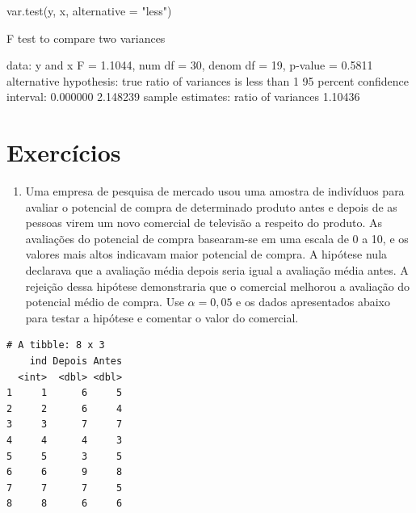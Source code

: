 \documentclass[
  10pt,
  a4paper]{book}
\newenvironment{Shaded}{\begin{snugshade}}{\end{snugshade}}
\newcommand{\AttributeTok}[1]{\textcolor[rgb]{0.77,0.63,0.00}{#1}}
\newcommand{\DecValTok}[1]{\textcolor[rgb]{0.00,0.00,0.81}{#1}}
\newcommand{\FloatTok}[1]{\textcolor[rgb]{0.00,0.00,0.81}{#1}}
\newcommand{\FunctionTok}[1]{\textcolor[rgb]{0.00,0.00,0.00}{#1}}
\newcommand{\NormalTok}[1]{#1}
\newcommand{\OtherTok}[1]{\textcolor[rgb]{0.56,0.35,0.01}{#1}}
\newcommand{\SpecialCharTok}[1]{\textcolor[rgb]{0.00,0.00,0.00}{#1}}
\newcommand{\StringTok}[1]{\textcolor[rgb]{0.31,0.60,0.02}{#1}}
\providecommand{\tightlist}{%
  \setlength{\itemsep}{0pt}\setlength{\parskip}{0pt}}
\begin{document}
\begin{Shaded}
\begin{Highlighting}[]
\FunctionTok{var.test}\NormalTok{(y, x, }\AttributeTok{alternative =} \StringTok{"less"}\NormalTok{)}

\NormalTok{    F test to compare two variances}

\NormalTok{data}\SpecialCharTok{:}\NormalTok{  y and x}
\NormalTok{F }\OtherTok{=} \FloatTok{1.1044}\NormalTok{, num df }\OtherTok{=} \DecValTok{30}\NormalTok{, denom df }\OtherTok{=} \DecValTok{19}\NormalTok{, p}\SpecialCharTok{{-}}\NormalTok{value }\OtherTok{=} \FloatTok{0.5811}
\NormalTok{alternative hypothesis}\SpecialCharTok{:}\NormalTok{ true ratio of variances is less than }\DecValTok{1}
\DecValTok{95}\NormalTok{ percent confidence interval}\SpecialCharTok{:}
 \FloatTok{0.000000} \FloatTok{2.148239}
\NormalTok{sample estimates}\SpecialCharTok{:}
\NormalTok{ratio of variances }
           \FloatTok{1.10436} 
\end{Highlighting}
\end{Shaded}

\hypertarget{exercuxedcios-19}{%
\section*{Exercícios}\label{exercuxedcios-19}}


\begin{enumerate}
\def\labelenumi{\arabic{enumi}.}
\tightlist
\item
  Uma empresa de pesquisa de mercado usou uma amostra de indivíduos para avaliar o potencial de compra de determinado produto antes e depois de as pessoas virem um novo comercial de televisão a respeito do produto. As avaliações do potencial de compra basearam-se em uma escala de 0 a 10, e os valores mais altos indicavam maior potencial de compra. A hipótese nula declarava que a avaliação média depois seria igual a avaliação média antes. A rejeição dessa hipótese demonstraria que o comercial melhorou a avaliação do potencial médio de compra. Use \(\alpha = 0,05\) e os dados apresentados abaixo para testar a hipótese e comentar o valor do comercial.
\end{enumerate}

\begin{verbatim}
# A tibble: 8 x 3
    ind Depois Antes
  <int>  <dbl> <dbl>
1     1      6     5
2     2      6     4
3     3      7     7
4     4      4     3
5     5      3     5
6     6      9     8
7     7      7     5
8     8      6     6
\end{verbatim}
\end{document}
